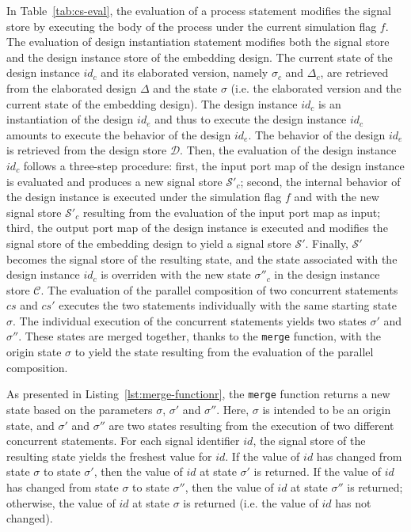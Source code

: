 In Table~\ref{tab:cs-eval}, the evaluation of a process statement
modifies the signal store by executing the body of the process under
the current simulation flag $f$. The evaluation of design
instantiation statement modifies both the signal store and the design
instance store of the embedding design. The current state of the
design instance $id_c$ and its elaborated version, namely $\sigma_c$
and $\Delta_c$, are retrieved from the elaborated design $\Delta$ and
the state $\sigma$ (i.e. the elaborated version and the current state
of the embedding design). The design instance $id_c$ is an
instantiation of the design $id_e$ and thus to execute the design
instance $id_c$ amounts to execute the behavior of the design
$id_e$. The behavior of the design $id_e$ is retrieved from the design
store $\mathcal{D}$. Then, the evaluation of the design instance
$id_c$ follows a three-step procedure: first, the input port map of
the design instance is evaluated and produces a new signal store
$\mathcal{S}'_c$; second, the internal behavior of the design instance
is executed under the simulation flag $f$ and with the new signal
store $\mathcal{S}'_c$ resulting from the evaluation of the input port
map as input; third, the output port map of the design instance is
executed and modifies the signal store of the embedding design to
yield a signal store $\mathcal{S}'$. Finally, $\mathcal{S}'$ becomes
the signal store of the resulting state, and the state associated with
the design instance $id_c$ is overriden with the new state
$\sigma''_c$ in the design instance store $\mathcal{C}$.  The
evaluation of the parallel composition of two concurrent statements
$cs$ and $cs'$ executes the two statements individually with the same
starting state $\sigma$. The individual execution of the concurrent
statements yields two states $\sigma'$ and $\sigma''$. These states
are merged together, thanks to the \texttt{merge} function, with the
origin state $\sigma$ to yield the state resulting from the evaluation
of the parallel composition.

As presented in Listing~\ref{lst:merge-functionr}, the \texttt{merge}
function returns a new state based on the parameters $\sigma$,
$\sigma'$ and $\sigma''$. Here, $\sigma$ is intended to be an origin
state, and $\sigma'$ and $\sigma''$ are two states resulting from the
execution of two different concurrent statements. For each signal
identifier $id$, the signal store of the resulting state yields the
freshest value for $id$. If the value of $id$ has changed from state
$\sigma$ to state $\sigma'$, then the value of $id$ at state $\sigma'$
is returned. If the value of $id$ has changed from state $\sigma$ to
state $\sigma''$, then the value of $id$ at state $\sigma''$ is
returned; otherwise, the value of $id$ at state $\sigma$ is returned
(i.e. the value of $id$ has not changed).

